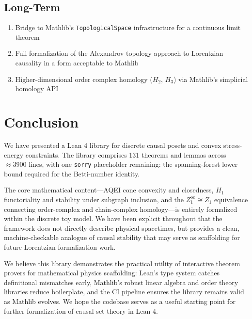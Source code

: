 \documentclass[12pt]{article}
\begin{document}
\subsection{Long-Term}

\begin{enumerate}
    \item Bridge to Mathlib's \texttt{TopologicalSpace} infrastructure for a continuous limit theorem
    \item Full formalization of the Alexandrov topology approach to Lorentzian causality in a form acceptable to Mathlib
    \item Higher-dimensional order complex homology ($H_2$, $H_3$) via Mathlib's simplicial homology API
\end{enumerate}

\section{Conclusion}

We have presented a Lean 4 library for discrete causal posets and convex stress-energy constraints. The library comprises 131 theorems and lemmas across $\approx 3900$ lines, with one \texttt{sorry} placeholder remaining: the spanning-forest lower bound required for the Betti-number identity.

The core mathematical content---AQEI cone convexity and closedness, $H_1$ functoriality and stability under subgraph inclusion, and the $Z_1^{\mathrm{oc}} \cong Z_1$ equivalence connecting order-complex and chain-complex homology---is entirely formalized within the discrete toy model. We have been explicit throughout that the framework does not directly describe physical spacetimes, but provides a clean, machine-checkable analogue of causal stability that may serve as scaffolding for future Lorentzian formalization work.

We believe this library demonstrates the practical utility of interactive theorem provers for mathematical physics scaffolding: Lean's type system catches definitional mismatches early, Mathlib's robust linear algebra and order theory libraries reduce boilerplate, and the CI pipeline ensures the library remains valid as Mathlib evolves. We hope the codebase serves as a useful starting point for further formalization of causal set theory in Lean 4.
\end{document}
